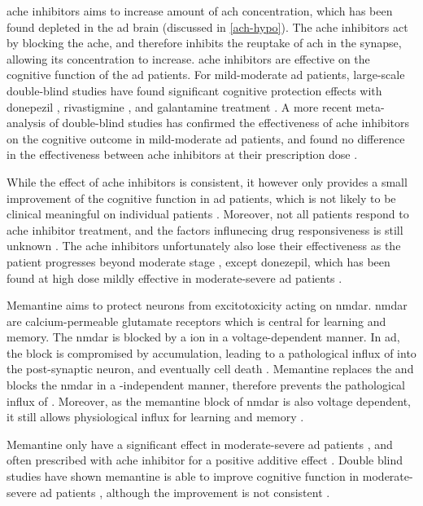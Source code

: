 \Gls{ache} inhibitors aims to increase amount of \gls{ach} concentration, which has been found depleted in the \gls{ad} brain (discussed in \ref{ach-hypo}). The \gls{ache} inhibitors act by blocking the \gls{ache}, and therefore inhibits the reuptake of \gls{ach} in the synapse, allowing its concentration to increase. \Gls{ache} inhibitors are effective on the cognitive function of the \gls{ad} patients. For mild-moderate \gls{ad} patients, large-scale double-blind studies have found significant cognitive protection effects with donepezil \citep{rogers98}, rivastigmine \citep{farlow00}, and galantamine treatment \citep{wilkinson01}. A more recent meta-analysis of double-blind studies has confirmed the effectiveness of \gls{ache} inhibitors on the cognitive outcome in mild-moderate \gls{ad} patients, and found no difference in the effectiveness between \gls{ache} inhibitors at their prescription dose \citep{tan14}.

While the effect of \gls{ache} inhibitors is consistent, it however only provides a small improvement of the cognitive function in \gls{ad} patients, which is not likely to be clinical meaningful on individual patients \citep{lin13}. Moreover, not all patients respond to \gls{ache} inhibitor treatment, and the factors influnecing drug responsiveness is still unknown \citep{vanderputt06}. The \gls{ache} inhibitors unfortunately also lose their effectiveness as the patient progresses beyond moderate stage \citep{gillette-guyonnet11}, except donezepil, which has been found at high dose mildly effective in moderate-severe \gls{ad} patients \citep{sabbagh13}. 

Memantine aims to protect neurons from excitotoxicity acting on \gls{nmdar}. \Gls{nmdar} are calcium-permeable glutamate receptors which is central for learning and memory. The \Gls{nmdar} is blocked by a  ion in a voltage-dependent manner. In \gls{ad}, the  block is compromised by \abeta accumulation, leading to a pathological influx of  into the post-synaptic neuron, and eventually cell death \citep{danysz12}. Memantine replaces the  and blocks the \gls{nmdar} in a \abeta-independent manner, therefore prevents the pathological influx of . Moreover, as the memantine block of \gls{nmdar} is also voltage dependent, it still allows physiological  influx for learning and memory \citep{danysz12}.

Memantine only have a significant effect in moderate-severe \gls{ad} patients \citep{reisberg03, tariot04, schneider11}, and often prescribed with \gls{ache} inhibitor for a positive additive effect \citep{rountree09}. Double blind studies have shown memantine is able to improve cognitive function in moderate-severe \gls{ad} patients \citep{reisberg03, tariot04}, although the improvement is not consistent \citep{porsteinsson08}. 

